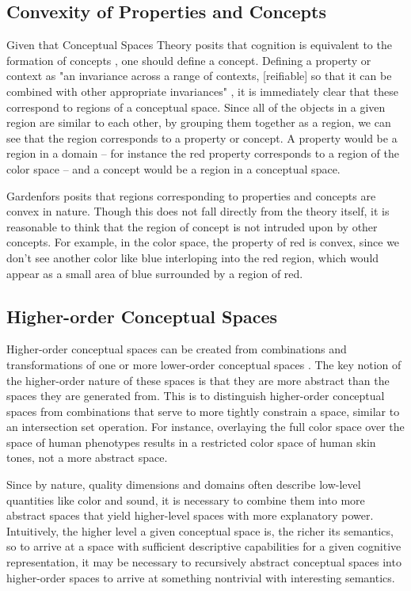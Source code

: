 \subsection{Convexity of Properties and Concepts}
\label{subsection:convexity-properties-concepts}

Given that Conceptual Spaces Theory posits that cognition is equivalent to the formation of concepts \cite{gardenfors2004conceptual}, one should define a concept.  Defining a property or context as "an invariance across a range of contexts, [reifiable] so that it can be combined with other appropriate invariances" \cite{kirsh1991today}, it is immediately clear that these correspond to regions of a conceptual space.  Since all of the objects in a given region are similar to each other, by grouping them together as a region, we can see that the region corresponds to a property or concept.  A property would be a region in a domain -- for instance the red property corresponds to a region of the color space -- and a concept would be a region in a conceptual space.

Gardenfors \cite{gardenfors2004conceptual} posits that regions corresponding to properties and concepts are convex in nature.  Though this does not fall directly from the theory itself, it is reasonable to think that the region of concept is not intruded upon by other concepts.  For example, in the color space, the property of red is convex, since we don't see another color like blue interloping into the red region, which would appear as a small area of blue surrounded by a region of red.

\subsection{Higher-order Conceptual Spaces}
\label{subsection:higher-order-conceptual-spaces}

Higher-order conceptual spaces can be created from combinations and transformations of one or more lower-order conceptual spaces \cite{gardenfors2004conceptual}.  The key notion of the higher-order nature of these spaces is that they are more abstract than the spaces they are generated from.  This is to distinguish higher-order conceptual spaces from combinations that serve to more tightly constrain a space, similar to an intersection set operation.  For instance, overlaying the full color space over the space of human phenotypes results in a restricted color space of human skin tones, not a more abstract space.

Since by nature, quality dimensions and domains often describe low-level quantities like color and sound, it is necessary to combine them into more abstract spaces that yield higher-level spaces with more explanatory power.  Intuitively, the higher level a given conceptual space is, the richer its semantics, so to arrive at a space with sufficient descriptive capabilities for a given cognitive representation, it may be necessary to recursively abstract conceptual spaces into higher-order spaces to arrive at something nontrivial with interesting semantics.
